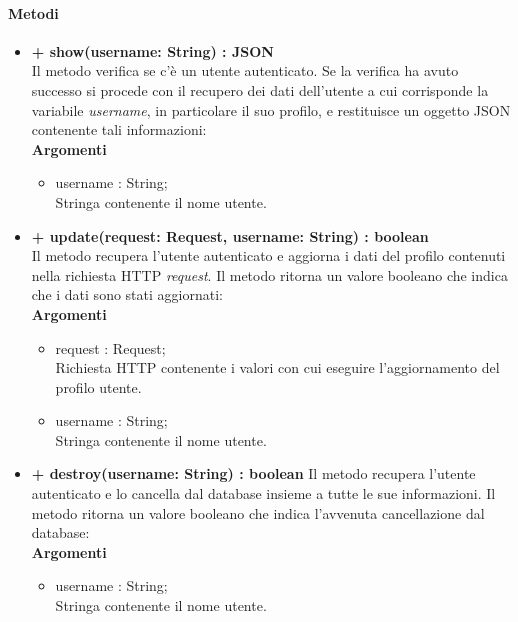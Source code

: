 	\paragraph{Metodi}
		\begin{itemize}
			\item \textbf{+ show(username: String) : JSON}\\
			Il metodo verifica se c'è un utente autenticato. Se la verifica ha avuto successo si procede con il recupero dei dati dell'utente a cui corrisponde la variabile \textit{username}, in particolare il suo profilo, e restituisce un oggetto JSON contenente tali informazioni:\\
			\textbf{Argomenti}
			\begin{itemize}
				\item username : String;\\
				Stringa contenente il nome utente.
			\end{itemize}
			
			\item \textbf{+ update(request: Request, username: String) : boolean}\\
			Il metodo recupera l'utente autenticato e aggiorna i dati del profilo contenuti nella richiesta HTTP \textit{request}. Il metodo ritorna un valore booleano che indica che i dati sono stati aggiornati:\\
			\textbf{Argomenti}
			\begin{itemize}
				\item request : Request;\\
				Richiesta HTTP contenente i valori con cui eseguire l'aggiornamento del profilo utente.
				\item username : String;\\
				Stringa contenente il nome utente.
			\end{itemize}
			
			\item \textbf{+ destroy(username: String) : boolean}
			Il metodo recupera l'utente autenticato e lo cancella dal database insieme a tutte le  sue informazioni. Il metodo ritorna un valore booleano che indica l'avvenuta cancellazione dal database:\\
			\textbf{Argomenti}
			\begin{itemize}
				\item username : String;\\
				Stringa contenente il nome utente.
			\end{itemize}
		\end{itemize}
		
